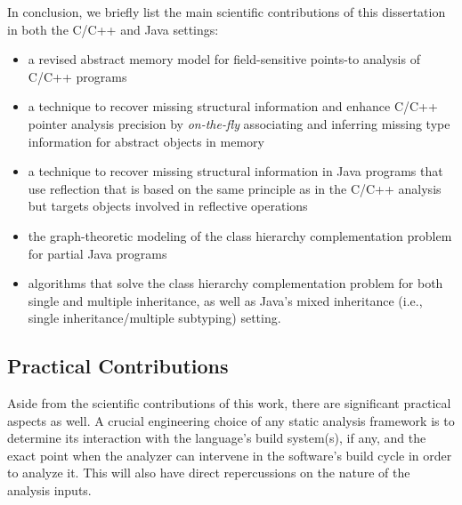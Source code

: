 In conclusion, we briefly list the main scientific contributions of
this dissertation in both the C/C++ and Java settings:
\begin{itemize}[--]
\item a revised abstract memory model for field-sensitive points-to
  analysis of C/C++ programs
\item a technique to recover missing structural information and
  enhance C/C++ pointer analysis precision by \emph{on-the-fly}
  associating and inferring missing type information for abstract
  objects in memory
\item a technique to recover missing structural information in Java
  programs that use reflection that is based on the same principle as
  in the C/C++ analysis but targets objects involved in reflective
  operations
\item the graph-theoretic modeling of the class hierarchy
  complementation problem for partial Java programs
\item algorithms that solve the class hierarchy complementation
  problem for both single and multiple inheritance, as well as Java's
  mixed inheritance (i.e., single inheritance/multiple subtyping)
  setting.
\end{itemize}


\subsection{Practical Contributions}

Aside from the scientific contributions of this work, there are
significant practical aspects as well. A crucial engineering choice of
any static analysis framework is to determine its interaction with the
language's build system(s), if any, and the exact point when the
analyzer can intervene in the software's build cycle in order to
analyze it. This will also have direct repercussions on the nature of
the analysis inputs.

